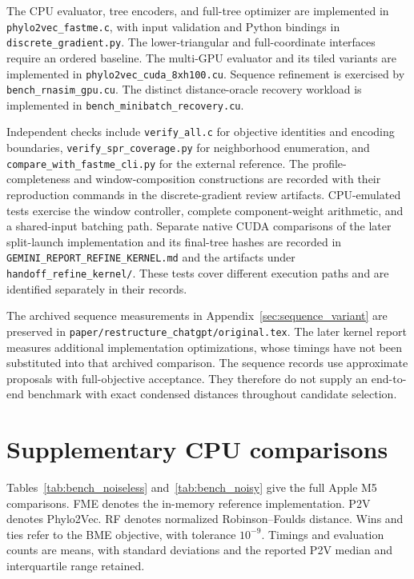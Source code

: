 The CPU evaluator, tree encoders, and full-tree optimizer are implemented in
\texttt{phylo2vec\_fastme.c}, with input validation and Python bindings in
\texttt{discrete\_gradient.py}.
The lower-triangular and full-coordinate interfaces require an ordered baseline.
The multi-GPU evaluator and its tiled variants are implemented in
\texttt{phylo2vec\_cuda\_8xh100.cu}.
Sequence refinement is exercised by \texttt{bench\_rnasim\_gpu.cu}.
The distinct distance-oracle recovery workload is implemented in
\texttt{bench\_minibatch\_recovery.cu}.

Independent checks include \texttt{verify\_all.c} for objective identities and encoding boundaries,
\texttt{verify\_spr\_coverage.py} for neighborhood enumeration, and
\texttt{compare\_with\_fastme\_cli.py} for the external reference.
The profile-completeness and window-composition constructions are recorded with their reproduction commands in the discrete-gradient review artifacts.
CPU-emulated tests exercise the window controller, complete component-weight arithmetic, and a shared-input batching path.
Separate native CUDA comparisons of the later split-launch implementation and its final-tree hashes are recorded in
\texttt{GEMINI\_REPORT\_REFINE\_KERNEL.md} and the artifacts under
\texttt{handoff\_refine\_kernel/}.
These tests cover different execution paths and are identified separately in their records.

The archived sequence measurements in Appendix~\ref{sec:sequence_variant} are preserved in
\nolinkurl{paper/restructure_chatgpt/original.tex}.
The later kernel report measures additional implementation optimizations, whose timings have not been substituted into that archived comparison.
The sequence records use approximate proposals with full-objective acceptance.
They therefore do not supply an end-to-end benchmark with exact condensed distances throughout candidate selection.

\section{Supplementary CPU comparisons}
\label{sec:cpu_tables}

Tables~\ref{tab:bench_noiseless} and~\ref{tab:bench_noisy} give the full Apple M5 comparisons.
FME denotes the in-memory reference implementation.
P2V denotes Phylo2Vec.
RF denotes normalized Robinson--Foulds distance.
Wins and ties refer to the BME objective, with tolerance $10^{-9}$.
Timings and evaluation counts are means, with standard deviations and the reported P2V median and interquartile range retained.

